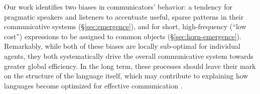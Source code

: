 \documentclass{article} %
\begin{document}
Our work identifies two biases in communicators' behavior: a tendency for pragmatic speakers
and listeners to accentuate useful, sparse patterns in their
communicative systems (\S\ref{sec:emergence}), and for short,
high-frequency (``low cost'') expressions to
be assigned to common objects (\S\ref{sec:horn-emergence}).
Remarkably, while both of these biases are locally sub-optimal for individual agents,
they both systematically drive the overall communicative system
towards greater global efficiency. In the long term, these processes
should leave their mark on the structure of the language itself, which
may contribute to explaining how languages become 
optimized for effective communication \cite{zipf1936,piantadosi2011}.








\newpage
\small


\end{document}
